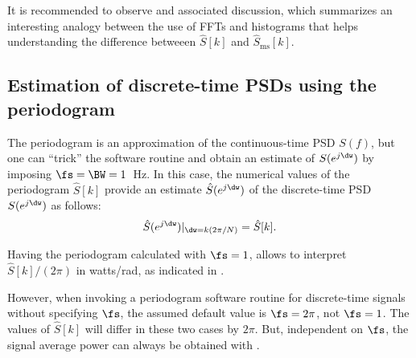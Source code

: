 It is recommended to observe  and associated discussion, which summarizes an interesting analogy between the use of FFTs and histograms that helps understanding the difference betweeen $\hat S[k]$ and $\hat S_{\textrm{ms}}[k]$.

\subsection{Estimation of discrete-time PSDs using the periodogram}

The periodogram is an approximation of the continuous-time PSD $S(f)$, but one can ``trick'' the software routine and obtain an estimate of $S(e^{j \dw})$ by imposing $\fs = \BW = 1$~Hz. In this case, the numerical values of the periodogram $\hat S[k]$ provide an estimate $\hat S(e^{j \dw})$ of the discrete-time PSD $S(e^{j \dw})$ as follows:
\begin{equation}
\hat S(e^{j \dw})|_{\dw = k (2 \pi/N)} = \hat S[k].
\label{eq:periodogram_discretetime4}
\end{equation}

Having the periodogram calculated with $\fs=1$, allows to interpret $\hat S[k] / (2 \pi)$ in watts/rad, as 
indicated in . 

However, when invoking a periodogram software routine for discrete-time signals without specifying $\fs$, the assumed default value is $\fs = 2 \pi$, not $\fs=1$. The values of $\hat S[k]$ will differ in these two cases by $2 \pi$. But, independent on $\fs$, the signal average power can always be obtained with .




%


